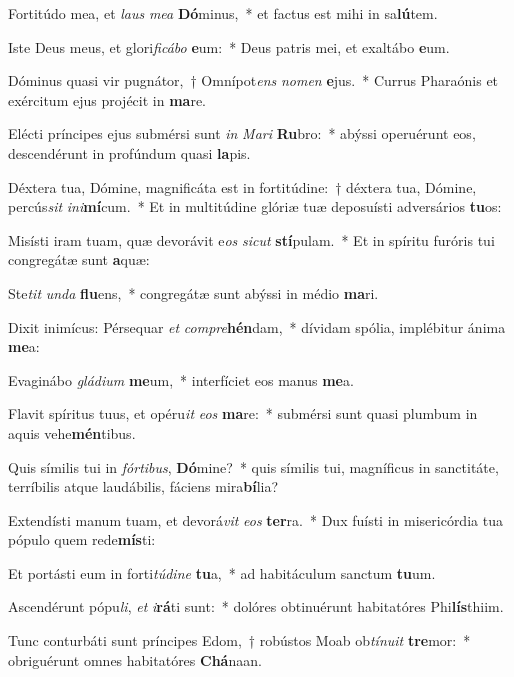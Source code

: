 \item Fortitúdo mea, et \textit{laus} \textit{me}\textit{a} \textbf{Dó}minus,~* et factus est mihi in sa\textbf{lú}tem.
\item Iste Deus meus, et glori\textit{fi}\textit{cá}\textit{bo} \textbf{e}um:~* Deus patris mei, et exaltábo \textbf{e}um.
\item Dóminus quasi vir pugnátor,~† Omnípot\textit{ens} \textit{no}\textit{men} \textbf{e}jus.~* Currus Pharaónis et exércitum ejus projécit in \textbf{ma}re.
\item Elécti príncipes ejus submérsi sunt \textit{in} \textit{Ma}\textit{ri} \textbf{Ru}bro:~* abýssi operuérunt eos, descendérunt in profúndum quasi \textbf{la}pis.
\item Déxtera tua, Dómine, magnificáta est in fortitúdine:~† déxtera tua, Dómine, percús\textit{sit} \textit{in}\textit{i}\textbf{mí}cum.~* Et in multitúdine glóriæ tuæ deposuísti adversários \textbf{tu}os:
\item Misísti iram tuam, quæ devorávit e\textit{os} \textit{sic}\textit{ut} \textbf{stí}pulam.~* Et in spíritu furóris tui congregátæ sunt \textbf{a}quæ:
\item Ste\textit{tit} \textit{un}\textit{da} \textbf{flu}ens,~* congregátæ sunt abýssi in médio \textbf{ma}ri.
\item Dixit inimícus: Pérsequar \textit{et} \textit{com}\textit{pre}\textbf{hén}dam,~* dívidam spólia, implébitur ánima \textbf{me}a:
\item Evaginábo \textit{glá}\textit{di}\textit{um} \textbf{me}um,~* interfíciet eos manus \textbf{me}a.
\item Flavit spíritus tuus, et opéru\textit{it} \textit{e}\textit{os} \textbf{ma}re:~* submérsi sunt quasi plumbum in aquis vehe\textbf{mén}tibus.
\item Quis símilis tui in \textit{fór}\textit{ti}\textit{bus}, \textbf{Dó}mine?~* quis símilis tui, magníficus in sanctitáte, terríbilis atque laudábilis, fáciens mira\textbf{bí}lia?
\item Extendísti manum tuam, et devorá\textit{vit} \textit{e}\textit{os} \textbf{ter}ra.~* Dux fuísti in misericórdia tua pópulo quem rede\textbf{mís}ti:
\item Et portásti eum in forti\textit{tú}\textit{di}\textit{ne} \textbf{tu}a,~* ad habitáculum sanctum \textbf{tu}um.
\item Ascendérunt pópu\textit{li}, \textit{et} \textit{i}\textbf{rá}ti sunt:~* dolóres obtinuérunt habitatóres Phi\textbf{lís}thiim.
\item Tunc conturbáti sunt príncipes Edom,~† robústos Moab ob\textit{tí}\textit{nu}\textit{it} \textbf{tre}mor:~* obriguérunt omnes habitatóres \textbf{Chá}naan.
